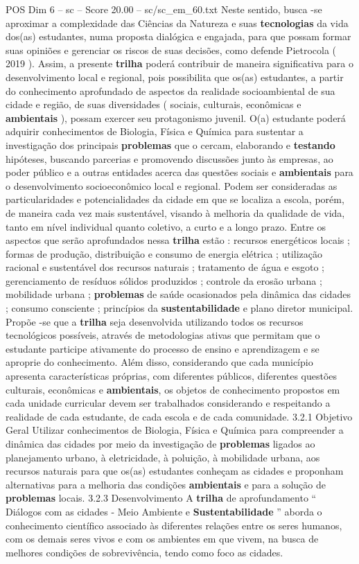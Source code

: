 \begin{textsample}{POS Dim 6 – sc – Score 20.00 – sc/sc\_em\_60.txt}
Neste sentido, busca -se aproximar a complexidade das Ciências da Natureza e suas \textbf{tecnologias} da vida dos(as) estudantes, numa proposta dialógica e engajada, para que possam formar suas opiniões e gerenciar os riscos de suas decisões, como defende Pietrocola ( 2019 ).
Assim, a presente \textbf{trilha} poderá contribuir de maneira significativa para o desenvolvimento local e regional, pois possibilita que os(as) estudantes, a partir do conhecimento aprofundado de aspectos da realidade socioambiental de sua cidade e região, de suas diversidades ( sociais, culturais, econômicas e \textbf{ambientais} ), possam exercer seu protagonismo juvenil.
O(a) estudante poderá adquirir conhecimentos de Biologia, Física e Química para sustentar a investigação dos principais \textbf{problemas} que o cercam, elaborando e \textbf{testando} hipóteses, buscando parcerias e promovendo discussões junto às empresas, ao poder público e a outras entidades acerca das questões sociais e \textbf{ambientais} para o desenvolvimento socioeconômico local e regional.
Podem ser consideradas as particularidades e potencialidades da cidade em que se localiza a escola, porém, de maneira cada vez mais sustentável, visando à melhoria da qualidade de vida, tanto em nível individual quanto coletivo, a curto e a longo prazo.
Entre os aspectos que serão aprofundados nessa \textbf{trilha} estão : recursos energéticos locais ; formas de produção, distribuição e consumo de energia elétrica ; utilização racional e sustentável dos recursos naturais ; tratamento de água e esgoto ; gerenciamento de resíduos sólidos produzidos ; controle da erosão urbana ; mobilidade urbana ; \textbf{problemas} de saúde ocasionados pela dinâmica das cidades ; consumo consciente ; princípios da \textbf{sustentabilidade} e plano diretor municipal.
Propõe -se que a \textbf{trilha} seja desenvolvida utilizando todos os recursos tecnológicos possíveis, através de metodologias ativas que permitam que o estudante participe ativamente do processo de ensino e aprendizagem e se aproprie do conhecimento.
Além disso, considerando que cada município apresenta características próprias, com diferentes públicos, diferentes questões culturais, econômicas e \textbf{ambientais}, os objetos de conhecimento propostos em cada unidade curricular devem ser trabalhados considerando e respeitando a realidade de cada estudante, de cada escola e de cada comunidade. 3.2.1 Objetivo Geral Utilizar conhecimentos de Biologia, Física e Química para compreender a dinâmica das cidades por meio da investigação de \textbf{problemas} ligados ao planejamento urbano, à eletricidade, à poluição, à mobilidade urbana, aos recursos naturais para que os(as) estudantes conheçam as cidades e proponham alternativas para a melhoria das condições \textbf{ambientais} e para a solução de \textbf{problemas} locais. 3.2.3 Desenvolvimento A \textbf{trilha} de aprofundamento “ Diálogos com as cidades - Meio Ambiente e \textbf{Sustentabilidade} ” aborda o conhecimento científico associado às diferentes relações entre os seres humanos, com os demais seres vivos e com os ambientes em que vivem, na busca de melhores condições de sobrevivência, tendo como foco as cidades.

\end{textsample}
